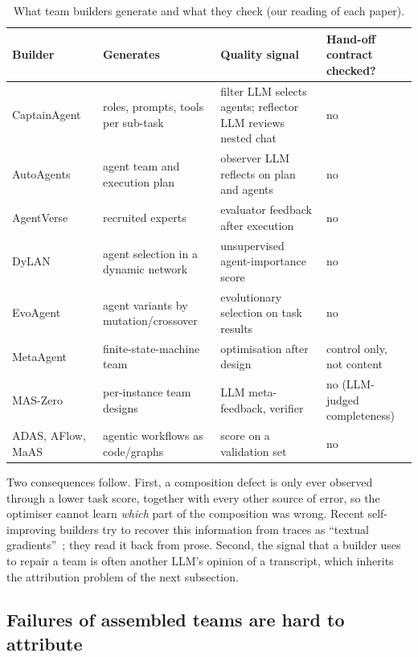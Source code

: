 \documentclass[10pt,a4paper]{article}
\begin{document}
\begin{table}[!htb]
\centering\small
\caption{What team builders generate and what they check (our reading of each paper).}
\label{tab:builders}
\begin{tabularx}{\textwidth}{@{}l X X X@{}}
\toprule
\rowcolor{white}Builder & Generates & Quality signal & Hand-off contract checked? \\
\midrule
CaptainAgent~\cite{song2024captain} & roles, prompts, tools per sub-task & filter LLM selects agents; reflector LLM reviews nested chat & no \\
AutoAgents~\cite{chen2024autoagents} & agent team and execution plan & observer LLM reflects on plan and agents & no \\
AgentVerse~\cite{chen2024agentverse} & recruited experts & evaluator feedback after execution & no \\
DyLAN~\cite{liu2024dylan} & agent selection in a dynamic network & unsupervised agent-importance score & no \\
EvoAgent~\cite{yuan2025evoagent} & agent variants by mutation/crossover & evolutionary selection on task results & no \\
MetaAgent~\cite{zhang2025metaagent} & finite-state-machine team & optimisation after design & control only, not content \\
MAS-Zero~\cite{ke2025maszero} & per-instance team designs & LLM meta-feedback, verifier & no (LLM-judged completeness) \\
ADAS, AFlow, MaAS~\cite{hu2025adas,zhang2025aflow,zhang2025maas} & agentic workflows as code/graphs & score on a validation set & no \\
\bottomrule
\end{tabularx}
\end{table}

Two consequences follow. First, a composition defect is only ever observed
through a lower task score, together with every other source of error, so
the optimiser cannot learn \emph{which} part of the composition was wrong.
Recent self-improving builders try to recover this information from
traces as ``textual gradients''~\cite{he2026tpgo}; they read it back from
prose. Second, the signal that a builder uses to repair a team is often
another LLM's opinion of a transcript, which inherits the attribution
problem of the next subsection.

\subsection{Failures of assembled teams are hard to attribute}\label{sec:ev-attrib}
\end{document}
